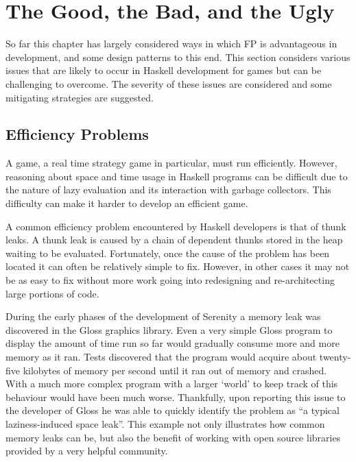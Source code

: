 \section{The Good, the Bad, and the Ugly}


So far this chapter has largely considered ways in which FP is advantageous in development, and some design patterns to this end. This section considers various issues that are likely to occur in Haskell development for games but can be challenging to overcome. The severity of these issues are considered and some mitigating strategies are suggested.

\subsection{Efficiency Problems}

A game, a real time strategy game in particular, must run efficiently.
However, reasoning about space and time usage in Haskell programs can be difficult due to the nature
of lazy evaluation and its interaction with garbage collectors.\cite{cheplyaka2012} This difficulty
can make it harder to develop an efficient game.

A common efficiency problem encountered by Haskell developers is that of thunk leaks.
A thunk leak is caused by a chain of dependent thunks stored in the heap waiting to
be evaluated. Fortunately, once the cause of the problem has been located it can often
be relatively simple to fix.\cite{ezyang2011} However, in other cases it may not be
as easy to fix without more work going into redesigning and re-architecting large
portions of code.

During the early phases of the development of Serenity a memory leak was discovered in
the Gloss graphics library. Even a very simple Gloss program to display the amount of time
run so far would gradually consume more and more memory as it ran. Tests discovered that
the program would acquire about twenty-five kilobytes of memory per second until it ran
out of memory and crashed. With a much more complex program with a larger `world' to keep
track of this behaviour would have been much worse. Thankfully, upon reporting this issue
to the developer of Gloss he was able to quickly identify the problem as ``a typical
laziness-induced space leak''. This example not only illustrates how
common memory leaks can be, but also the benefit of working with open source libraries
provided by a very helpful community.

